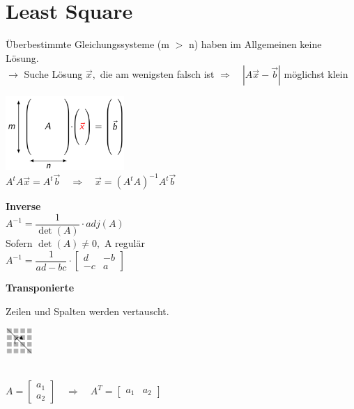 \section{Least Square }
	Überbestimmte Gleichungssysteme (m $>$ n) haben im Allgemeinen keine Lösung.\\
	$\rightarrow$ Suche Lösung $\vec{x},$ die am wenigsten	falsch ist $\Rightarrow \quad|A \vec{x}-\vec{b}|$ möglichst klein \\
	\begin{minipage}[b]{0.3\textwidth}
		\includegraphics[width=4.5cm]{./bilder/LeastSquare.png}\\
		
		$\boxed{A^{t} A \vec{x}=A^{t} \vec{b} \quad \Rightarrow \quad \vec{x}=\left(A^{t} A\right)^{-1} A^{t} \vec{b}}$
	\end{minipage}\qquad \vline \quad%
	\begin{minipage}[b]{0.3\textwidth}
		\textbf{Inverse}\\[2mm]
		$A^{-1}=\dfrac{1}{\operatorname{det}(A)} \cdot a d j(A) \quad$\\[2mm]
		Sofern $\operatorname{det}(A) \neq 0,$ A regulär\\[5mm]
		$\boxed{A^{-1}=\dfrac{1}{a d-b c} \cdot\left[\begin{array}{cc}{d} & {-b} \\ {-c} & {a}\end{array}\right]}$\\
	\end{minipage}\qquad%
	\begin{minipage}[b]{0.35\textwidth}
		\textbf{Transponierte}\\[2mm]
		\begin{minipage}{0.5\textwidth}			
			Zeilen und Spalten werden vertauscht.
		\end{minipage}%
		\begin{minipage}{0.5\textwidth}
			\quad\includegraphics[height=1cm]{./bilder/Transponierte.png}
		\end{minipage}\\[5mm]
		
		$A = \left[\begin{matrix} a_1 \\ a_2 \end{matrix}\right] \quad \Rightarrow \quad A^T = \left[\begin{matrix} a_1 & a_2 \end{matrix}\right] $
	\end{minipage}